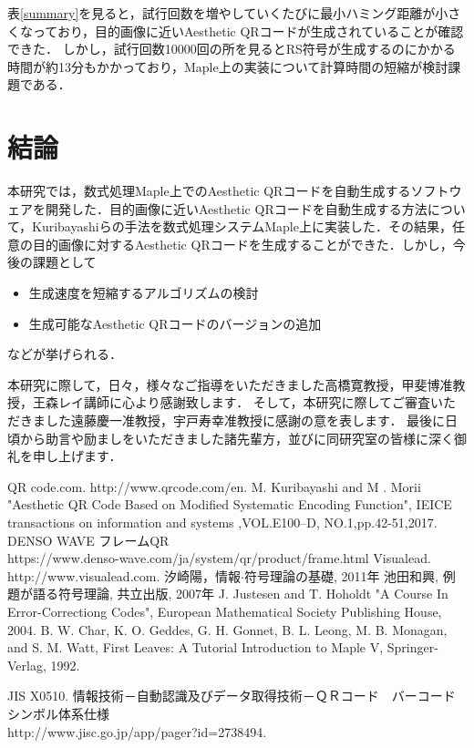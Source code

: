\documentclass{thesis}
\begin{document}
表\ref{summary}を見ると，試行回数を増やしていくたびに最小ハミング距離が小さくなっており，目的画像に近いAesthetic QRコードが生成されていることが確認できた．
しかし，試行回数10000回の所を見るとRS符号が生成するのにかかる時間が約13分もかかっており，Maple上の実装について計算時間の短縮が検討課題である．
 


\chapter{結論}
\label{chap:5}

本研究では，数式処理Maple上でのAesthetic QRコードを自動生成するソフトウェアを開発した．目的画像に近いAesthetic QRコードを自動生成する方法について，Kuribayashiらの手法を数式処理システムMaple上に実装した．その結果，任意の目的画像に対するAesthetic QRコードを生成することができた．しかし，今後の課題として
\begin{itemize}
\setlength{\itemsep}{5mm}
 \item 生成速度を短縮するアルゴリズムの検討
 \item 生成可能なAesthetic QRコードのバージョンの追加
 \end{itemize}
などが挙げられる．


\acknowledgement

本研究に際して，日々，様々なご指導をいただきました高橋寛教授，甲斐博准教授，王森レイ講師に心より感謝致します．
そして，本研究に際してご審査いただきました遠藤慶一准教授，宇戸寿幸准教授に感謝の意を表します．
最後に日頃から助言や励ましをいただきました諸先輩方，並びに同研究室の皆様に深く御礼を申し上げます．


\begin{thebibliography}{99}

%
QR code.com. http://www.qrcode.com/en.
%
M. Kuribayashi and M . Morii "Aesthetic QR Code Based on Modified Systematic Encoding Function",
IEICE transactions on information and systems ,VOL.E100–D, NO.1,pp.42-51,2017.
%
DENSO WAVE フレームQR\\ 
https://www.denso-wave.com/ja/system/qr/product/frame.html
%
Visualead. http://www.visualead.com.
%
汐崎陽，情報$\cdot$符号理論の基礎, 2011年
%
池田和興, 例題が語る符号理論, 共立出版, 2007年
%
J. Justesen and T. Hoholdt "A Course In Error-Correctiong Codes",
European Mathematical Society Publishing House, 2004.
%
B. W. Char, K. O. Geddes, G. H. Gonnet, B. L. Leong, M. B. Monagan, and S. M. Watt,
First Leaves: A Tutorial Introduction to Maple V, Springer-Verlag, 1992. 

%

JIS X0510. 	情報技術－自動認識及びデータ取得技術－ＱＲコード　バーコードシンボル体系仕様\\http://www.jisc.go.jp/app/pager?id=2738494. 
\end{thebibliography}
\end{document}
